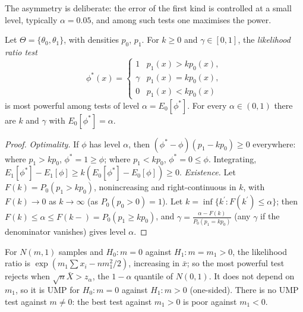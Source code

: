 The asymmetry is deliberate: the error of the first kind is controlled at a small level, typically $\alpha = 0.05$, and among such tests one maximises the power.

\begin{theorem}\label{statistics:theorem-neyman-pearson}
Let $\Theta = \{\theta_0, \theta_1\}$, with densities $p_0$, $p_1$. For $k \geq 0$ and $\gamma \in [0, 1]$, the \emph{likelihood ratio test}
\[
\phi^*(x) = \begin{cases} 1 & p_1(x) > kp_0(x), \\ \gamma & p_1(x) = kp_0(x), \\ 0 & p_1(x) < kp_0(x) \end{cases}
\]
is most powerful among tests of level $\alpha = E_0[\phi^*]$. For every $\alpha \in (0, 1)$ there are $k$ and $\gamma$ with $E_0[\phi^*] = \alpha$.
\end{theorem}

\begin{proof}
\emph{Optimality.} If $\phi$ has level $\alpha$, then $(\phi^* - \phi)(p_1 - kp_0) \geq 0$ everywhere: where $p_1 > kp_0$, $\phi^* = 1 \geq \phi$; where $p_1 < kp_0$, $\phi^* = 0 \leq \phi$. Integrating,
$E_1[\phi^*] - E_1[\phi] \geq k(E_0[\phi^*] - E_0[\phi]) \geq 0$. \emph{Existence.} Let $F(k) = P_0(p_1 > kp_0)$, nonincreasing and right-continuous in $k$, with $F(k) \to 0$ as $k \to \infty$ (as $P_0(p_0 > 0) = 1$). Let
$k = \inf\{k^{\prime} : F(k^{\prime}) \leq \alpha\}$; then $F(k) \leq \alpha \leq F(k-) = P_0(p_1 \geq kp_0)$, and $\gamma = \frac{\alpha - F(k)}{P_0(p_1 = kp_0)}$ (any $\gamma$ if the denominator vanishes) gives level $\alpha$.
\end{proof}

\begin{example}\label{statistics:example-neyman-pearson}
For $N(m, 1)$ samples and $H_0 : m = 0$ against $H_1 : m = m_1 > 0$, the likelihood ratio is $\exp(m_1\sum x_i - nm_1^2/2)$, increasing in $\bar x$; so the most powerful test rejects when $\sqrt n\bar X > z_\alpha$, the $1 - \alpha$
quantile of $N(0, 1)$. It does not depend on $m_1$, so it is UMP for $H_0 : m = 0$ against $H_1 : m > 0$ (one-sided). There is no UMP test against $m \neq 0$: the best test against $m_1 > 0$ is poor against $m_1 < 0$.
\end{example}

